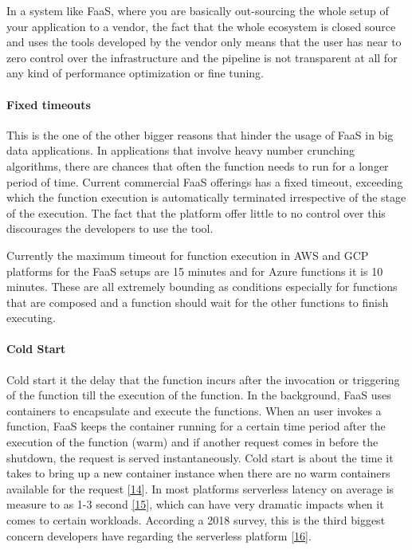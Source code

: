 \documentclass[12pt,titlepage]{article}
\begin{document}
In a system like FaaS, where you are basically out-sourcing the whole setup of
your application to a vendor, the fact that the whole ecosystem is closed source
and uses the tools developed by the vendor only means that the user has near to
zero control over the infrastructure and the pipeline is not transparent at all
for any kind of performance optimization or fine tuning.

\paragraph{Fixed timeouts}
\label{sec:org89a00d1}
This is the one of the other bigger reasons that hinder the usage of FaaS in big
data applications. In applications that involve heavy number crunching
algorithms, there are chances that often the function needs to run for a longer
period of time. Current commercial FaaS offerings has a fixed timeout, exceeding
which the function execution is automatically terminated irrespective of the
stage of the execution. The fact that the platform offer little to no control
over this discourages the developers to use the tool.

Currently the maximum timeout for function execution in AWS and GCP platforms
for the FaaS setups are 15 minutes and for Azure functions it is 10 minutes.
These are all extremely bounding as conditions especially for functions that are
composed and a function should wait for the other functions to finish executing.

\paragraph{Cold Start}
\label{sec:org88e8e79}
Cold start it the delay that the function incurs after the invocation or
triggering of the function till the execution of the function. In the
background, FaaS uses containers to encapsulate and execute the functions. When
an user invokes a function, FaaS keeps the container running for a certain time
period after the execution of the function (warm) and if another request comes
in before the shutdown, the request is served instantaneously. Cold start is
about the time it takes to bring up a new container instance when there are no
warm containers available for the request \hyperref[ref:14]{[14}]. In most platforms
serverless latency on average is measure to as 1-3 second \hyperref[ref:15]{[15}], which can
have very dramatic impacts when it comes to certain workloads. According a 2018 survey, this is the third biggest concern developers have
regarding the serverless platform \hyperref[ref:16]{[16}].
\end{document}
